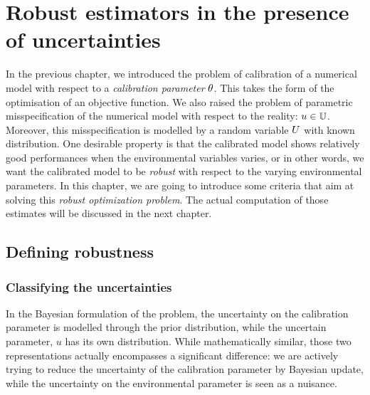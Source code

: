 \documentclass[../../Main_ManuscritThese.tex]{subfiles}
\begin{document}
\chapter{Robust estimators in the presence of uncertainties} 
\label{chap:robust_estimators}

\minitoc
\newpage
\subfileLocal{\pagestyle{contentStyle}}
In the previous chapter, we introduced the problem of calibration of a numerical model with respect to a \emph{calibration parameter} $\theta$. This takes the form of the optimisation of an objective function. We also raised the problem of parametric misspecification of the numerical model with respect to the reality: $u \in \mathbb{U}$. Moreover, this misspecification is modelled by a random variable $U$ with known distribution.
One desirable property is that the calibrated model shows relatively good performances when the environmental variables varies, or in other words, we want the calibrated model to be \emph{robust} with respect to the varying environmental parameters. In this chapter, we are going to introduce some criteria that aim at solving this \emph{robust optimization problem}. The actual computation of those estimates will be discussed in the next chapter.

\section{Defining robustness}
\label{sec:def_robustness}
\subsection{Classifying the uncertainties}
In the Bayesian formulation of the problem, the uncertainty on the calibration parameter is modelled through the prior distribution, while the uncertain parameter, $u$ has its own distribution. While mathematically similar, those two representations actually encompasses a significant difference: we are actively trying to reduce the uncertainty of the calibration parameter by Bayesian update, while the uncertainty on the environmental parameter is seen as a nuisance.
\end{document}
